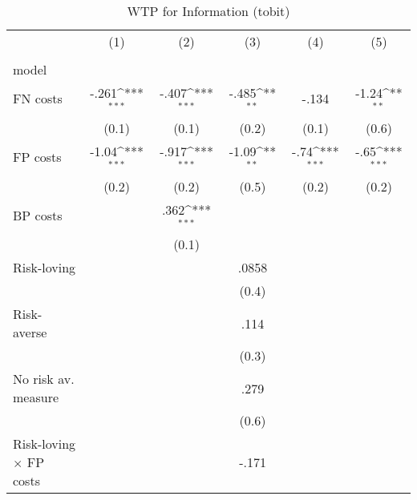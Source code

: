 \begin{table}[htbp]\centering
\def\sym#1{\ifmmode^{#1}\else\(^{#1}\)\fi}
\caption{WTP for Information (tobit)}
\begin{tabular}{l*{5}{c}}
\hline\hline
                &\multicolumn{1}{c}{(1)}&\multicolumn{1}{c}{(2)}&\multicolumn{1}{c}{(3)}&\multicolumn{1}{c}{(4)}&\multicolumn{1}{c}{(5)}\\
                &\multicolumn{1}{c}{}&\multicolumn{1}{c}{}&\multicolumn{1}{c}{}&\multicolumn{1}{c}{}&\multicolumn{1}{c}{}\\
\hline
model           &                  &                  &                  &                  &                  \\
FN costs        &    -.261\sym{***}&    -.407\sym{***}&    -.485\sym{**} &    -.134         &    -1.24\sym{**} \\
                &    (0.1)         &    (0.1)         &    (0.2)         &    (0.1)         &    (0.6)         \\
FP costs        &    -1.04\sym{***}&    -.917\sym{***}&    -1.09\sym{**} &     -.74\sym{***}&     -.65\sym{***}\\
                &    (0.2)         &    (0.2)         &    (0.5)         &    (0.2)         &    (0.2)         \\
BP costs        &                  &     .362\sym{***}&                  &                  &                  \\
                &                  &    (0.1)         &                  &                  &                  \\
Risk-loving     &                  &                  &    .0858         &                  &                  \\
                &                  &                  &    (0.4)         &                  &                  \\
Risk-averse     &                  &                  &     .114         &                  &                  \\
                &                  &                  &    (0.3)         &                  &                  \\
No risk av. measure&                  &                  &     .279         &                  &                  \\
                &                  &                  &    (0.6)         &                  &                  \\
Risk-loving $\times$ FP costs&                  &                  &    -.171         &                  &                  \\

\end{tabular}
\end{table}
